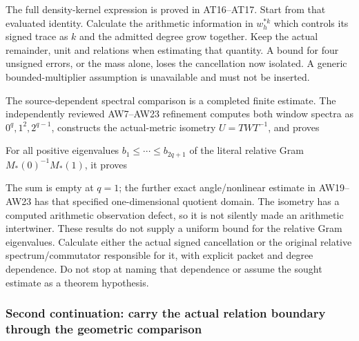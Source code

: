  

The full density-kernel expression is proved in AT16--AT17. Start from
that evaluated identity. Calculate the arithmetic information in
\(w_h^{*k}\) which controls its signed trace as \(k\) and the admitted
degree grow together. Keep the actual remainder, unit and relations when
estimating that quantity. A bound for four unsigned errors, or the mass
alone, loses the cancellation now isolated. A generic bounded-multiplier
assumption is unavailable and must not be inserted.

The source-dependent spectral comparison is a completed finite estimate.
The independently reviewed AW7--AW23 refinement computes both window
spectra as \(0^q,1^2,2^{q-1}\), constructs the actual-metric isometry
\(U=TWT^{-1}\), and proves


For all positive eigenvalues \(b_1\le\cdots\le b_{2q+1}\) of the literal
relative Gram \(M_*(0)^{-1}M_*(1)\), it proves


The sum is empty at \(q=1\); the further exact angle/nonlinear estimate
in AW19--AW23 has that specified one-dimensional quotient domain. The
isometry has a computed arithmetic observation defect, so it is not
silently made an arithmetic intertwiner. These results do not supply a
uniform bound for the relative Gram eigenvalues. Calculate either the
actual signed cancellation or the original relative spectrum/commutator
responsible for it, with explicit packet and degree dependence. Do not
stop at naming that dependence or assume the sought estimate as a
theorem hypothesis.

\subsubsection{Second continuation: carry the actual relation boundary
through the geometric
comparison}\label{second-continuation-carry-the-actual-relation-boundary-through-the-geometric-comparison}

